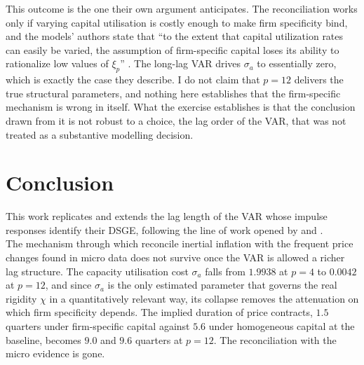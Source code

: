\documentclass[12pt, a4paper]{article}
\begin{document}
This outcome is the one their own argument anticipates. The reconciliation works only if varying
capital utilisation is costly enough to make firm specificity bind, and the models' authors state
that ``to the extent that capital utilization rates can easily be varied, the assumption of
firm-specific capital loses its ability to rationalize low values of $\xi_p$''
\citep[p.~227]{ACEL2011}. The long-lag VAR drives $\sigma_a$ to essentially zero, which is
exactly the case they describe. I do not claim that $p = 12$ delivers the true structural
parameters, and nothing here establishes that the firm-specific mechanism is wrong in itself.
What the exercise establishes is that the conclusion drawn from it is not robust to a choice,
the lag order of the VAR, that was not treated as a substantive modelling decision.


\section{Conclusion}
\label{sec:conclusion}

This work replicates \citet{ACEL2005WP} and extends the lag length of the VAR whose impulse
responses identify their DSGE, following the line of work opened by \citet{Long_Lag2025} and
\citet{Baumeister2025}.
\\

The mechanism through which \citet{ACEL2011} reconcile inertial inflation with the frequent price
changes found in micro data does not survive once the VAR is allowed a richer lag structure. The
capacity utilisation cost $\sigma_a$ falls from $1.9938$ at $p = 4$ to $0.0042$ at $p = 12$, and
since $\sigma_a$ is the only estimated parameter that governs the real rigidity $\chi$ in a
quantitatively relevant way, its collapse removes the attenuation on which firm specificity
depends. The implied duration of price contracts, $1.5$ quarters under firm-specific capital
against $5.6$ under homogeneous capital at the baseline, becomes $9.0$ and $9.6$ quarters at
$p = 12$. The reconciliation with the micro evidence is gone.
\\
\end{document}
